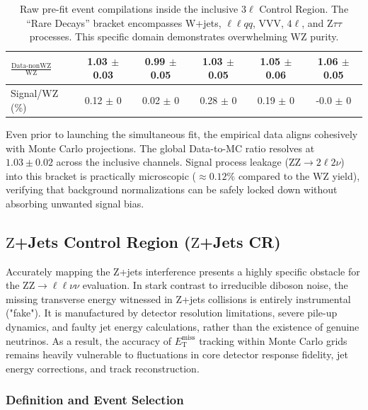 \begin{table}[htbp]
{\begin{tabular}{|l|c|c|c|c|c|}
$\frac{\text{Data-nonWZ}}{\text{WZ}}$ & 1.03 $\pm$ 0.03 & 0.99 $\pm$ 0.05 & 1.03 $\pm$ 0.05 & 1.05 $\pm$ 0.06 & 1.06 $\pm$ 0.05 \\ \hline
Signal/$\text{WZ}$ (\%) & 0.12 $\pm$ 0 & 0.02 $\pm$ 0 & 0.28 $\pm$ 0 & 0.19 $\pm$ 0 & -0.0 $\pm$ 0 \\ \hline
\end{tabular}%
}
\caption{Raw pre-fit event compilations inside the inclusive 3$\ell$ Control Region. The ``Rare Decays'' bracket encompasses $\text{W}$+jets, $\ell\ell qq$, $\text{VVV}$, $4\ell$, and $\text{Z}\tau\tau$ processes. This specific domain demonstrates overwhelming $\text{WZ}$ purity.}
\label{table:3lCR_unscaled}
\end{table}

Even prior to launching the simultaneous fit, the empirical data aligns cohesively with Monte Carlo projections. The global Data-to-MC ratio resolves at $1.03 \pm 0.02$ across the inclusive channels. Signal process leakage ($\text{ZZ} \to 2\ell2\nu$) into this bracket is practically microscopic ($\approx 0.12\%$ compared to the $\text{WZ}$ yield), verifying that background normalizations can be safely locked down without absorbing unwanted signal bias.


\subsection{$\text{Z}$+Jets Control Region ($\text{Z}$+Jets CR)}
\label{sec:bkg_ZjetsCR}

Accurately mapping the $\text{Z}$+jets interference presents a highly specific obstacle for the $\text{ZZ} \to \ell\ell\nu\nu$ evaluation. In stark contrast to irreducible diboson noise, the missing transverse energy witnessed in $\text{Z}$+jets collisions is entirely instrumental ("fake"). It is manufactured by detector resolution limitations, severe pile-up dynamics, and faulty jet energy calculations, rather than the existence of genuine neutrinos. As a result, the accuracy of $E_{\text{T}}^{\text{miss}}$ tracking within Monte Carlo grids remains heavily vulnerable to fluctuations in core detector response fidelity, jet energy corrections, and track reconstruction.

\subsubsection{Definition and Event Selection}

